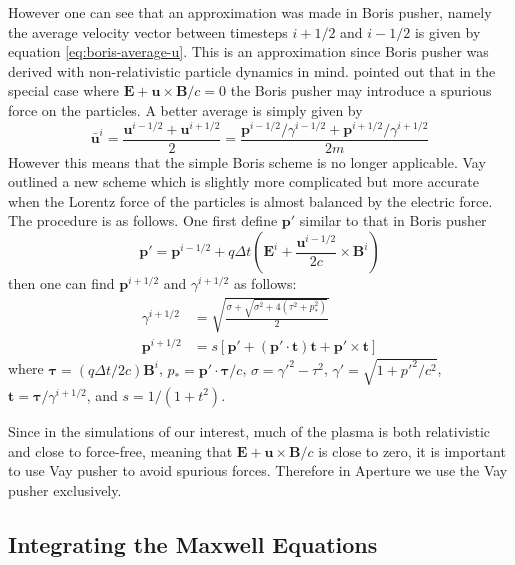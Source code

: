 However one can see that an approximation was made in Boris pusher, namely the
average velocity vector between timesteps $i+1/2$ and $i-1/2$ is given by
equation \eqref{eq:boris-average-u}. This is an approximation since
Boris pusher was derived with non-relativistic particle dynamics in mind.
\citet{vay_simulation_2008} pointed out that in the special case where
$\mathbf{E} + \mathbf{u}\times \mathbf{B}/c = 0$ the Boris pusher may introduce a
spurious force on the particles. A better average is simply given by
\begin{equation}
  \label{eq:vay-average-u}
  \mathbf{\bar{u}}^i = \frac{\mathbf{u}^{i-1/2} + \mathbf{u}^{i+1/2}}{2} = \frac{\mathbf{p}^{i-1/2}/\gamma^{i-1/2} + \mathbf{p}^{i+1/2}/\gamma^{i+1/2}}{2m}
\end{equation}
However this means that the simple Boris scheme is no longer applicable. Vay
outlined a new scheme which is slightly more complicated but more accurate when
the Lorentz force of the particles is almost balanced by the electric force. The
procedure is as follows. One first define $\mathbf{p}'$ similar to that in Boris
pusher
\begin{equation}
  \label{eq:vay-p-prime}
  \mathbf{p}' = \mathbf{p}^{i-1/2} + q\Delta t\left( \mathbf{E}^i + \frac{\mathbf{u}^{i-1/2}}{2c}\times \mathbf{B}^i \right)
\end{equation}
then one can find $\mathbf{p}^{i+1/2}$ and $\gamma^{i+1/2}$ as follows:
\begin{align}
  \label{eq:vay-solution}
  \gamma^{i+1/2} &= \sqrt{\frac{\sigma + \sqrt{\sigma^2 + 4(\tau^2 + p_{*}^2)}}{2}} \\
  \mathbf{p}^{i+1/2} &= s \left[ \mathbf{p}' + (\mathbf{p}'\cdot \mathbf{t})\mathbf{t} + \mathbf{p}'\times \mathbf{t} \right]
\end{align}
where $\bm{\tau} = (q\Delta t/2c)\mathbf{B}^i$, $p_{*}=\mathbf{p}'\cdot\bm{\tau}/c$,
$\sigma = \gamma'^2-\tau^2$, $\gamma' = \sqrt{1 + p'^2/c^2}$, $\mathbf{t} =
\bm{\tau}/\gamma^{i+1/2}$, and $s = 1/(1 + t^2)$.

Since in the simulations of our interest, much of the plasma is both
relativistic and close to force-free, meaning that $\mathbf{E} +
\mathbf{u}\times \mathbf{B}/c$ is close to zero, it is important to use Vay
pusher to avoid spurious forces. Therefore in Aperture we use the Vay pusher
exclusively.

\subsection{Integrating the Maxwell Equations}
\label{sec:fd-maxwell}

